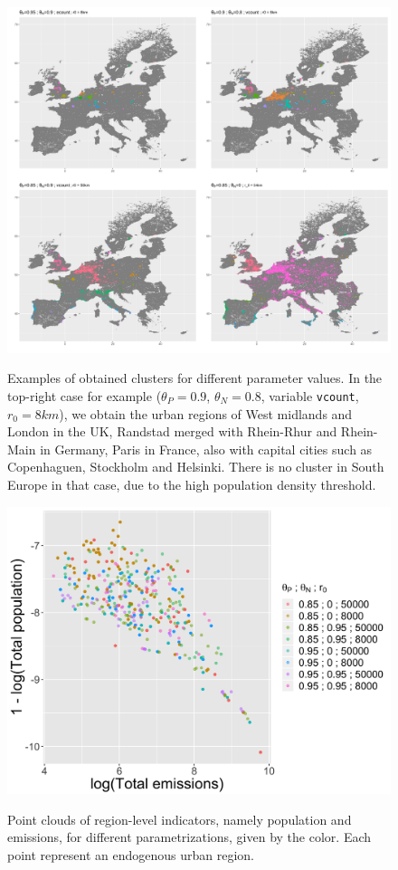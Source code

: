 \documentclass{jimis-en}
\begin{document}
\begin{figure}[!ht] 
{\includegraphics[width=\linewidth]{Fig4.png}}
  \centering
  \caption{Examples of obtained clusters for different parameter values. In the top-right case for example ($\theta_P = 0.9$, $\theta_N = 0.8$, variable \texttt{vcount},$r_0 = 8km$), we obtain the urban regions of West midlands and London in the UK, Randstad merged with Rhein-Rhur and Rhein-Main in Germany, Paris in France, also with capital cities such as Copenhaguen, Stockholm and Helsinki. There is no cluster in South Europe in that case, due to the high population density threshold.\label{fig:exclusters}}
\end{figure}


\begin{figure}[!ht] 
  {\includegraphics[width=0.7\linewidth]{Fig5.png}}
  \centering
  \caption{Point clouds of region-level indicators, namely population and emissions, for different parametrizations, given by the color. Each point represent an endogenous urban region.\label{fig:paretos}}
\end{figure}
\end{document}
